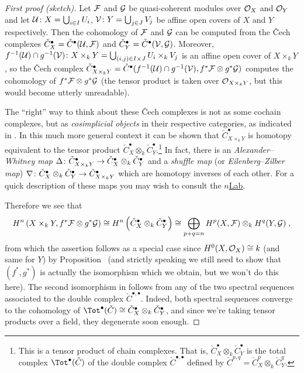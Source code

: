 \documentclass[a4paper,parskip=half,numbers=enddot, DIV=12]{scrreprt}
\begin{document}
\begin{proof}[First proof (sketch)]
	Let $\mathcal{F}$ and $\mathcal{G}$ be quasi-coherent modules over $\mathcal{O}_X$ and $\mathcal{O}_Y$ and let $\mathcal{U}\colon X=\bigcup_{i\in I}U_i$, $\mathcal{V}\colon Y=\bigcup_{j\in J}V_j$ be affine open covers of $X$ and $Y$ respectively. Then the cohomology of $\mathcal{F}$ and $\mathcal{G}$ can be computed from the \v Cech complexes $\check{C}_X^\bullet=\check{C}^\bullet(\mathcal{U},\mathcal{F})$ and $\check{C}_Y^\bullet=\check{C}^\bullet(\mathcal{V},\mathcal{G})$. Moreover, $f^{-1}(\mathcal{U})\cap g^{-1}(\mathcal{V})\colon X\times_kY=\bigcup_{(i,j)\in I\times J}U_i\times_kV_j$ is an affine open cover of $X\times_kY$, so the \v Cech complex $\check{C}_{X\times_kY}^\bullet=\check{C}^\bullet(f^{-1}(\mathcal{U})\cap g^{-1}(\mathcal{V}),f^*\mathcal{F}\otimes g^*\mathcal{G})$ computes the cohomology of $f^*\mathcal{F}\otimes g^*\mathcal{G}$ (the tensor product is taken over $\mathcal{O}_{X\times_kY}$, but this would become utterly unreadable).
	
	The ``right'' way to think about these \v Cech complexes is not as some cochain complexes, but as \emph{cosimplicial objects} in their respective categories, as indicated in \cite[Remark~1.2.1]{alggeo2}. In this much more general context it can be shown that $\check{C}_{X\times_kY}^\bullet$ is homotopy equivalent to the tensor product $\check{C}_X^\bullet\otimes_k\check{C}_Y^\bullet$.\footnote{This is a tensor product of chain complexes. That is, $\check{C}_X^\bullet\otimes_k\check{C}_Y^\bullet$ is the total complex $\Tot^\bullet(\check{C})$ of the double complex $\check{C}^{\bullet,\bullet}$ defined by $\check{C}^{p,q}=\check{C}_X^p\otimes_k\check{C}_Y^q$.} In fact, there is an \emph{Alexander--Whitney map} $\Delta\colon \check{C}_{X\times_kY}^\bullet\morphism\check{C}_X^\bullet\otimes_k\check{C}_Y^\bullet$ and a \emph{shuffle map} (or \emph{Eilenberg--Zilber map}) $\nabla\colon\check{C}_X^\bullet\otimes_k\check{C}_Y^\bullet\morphism\check{C}_{X\times_kY}^\bullet$ which are homotopy inverses of each other. For a quick description of these maps you may wish to consult the \href{https://ncatlab.org/nlab/show/Alexander-Whitney+map}{$n$Lab}.
	
	Therefore we see that
	\begin{align}\lbl{eq:Künneth}
		H^n\left(X\times_kY,f^*\Ff\otimes g^*\Gg\right)\cong H^n\left(\check{C}_X^\bullet\otimes_k\check{C}_Y^\bullet\right)\cong \bigoplus_{p+q=n}H^p(X,\Ff)\otimes_kH^q(Y,\Gg)\;,
	\end{align}
	from which the assertion follows as a special case since $H^0(X,\mathcal{O}_X)\cong k$ (and same for $Y$) by Proposition~ (and strictly speaking we still need to show that $(f^*,g^*)$ is actually the isomorphism which we obtain, but we won't do this here). The second isomorphism in  follows from any of the two spectral sequences associated to the double complex $\check{C}^{\bullet,\bullet}$. Indeed, both spectral sequences converge to the cohomology of $\Tot^\bullet(\check{C})\cong \check{C}_X^\bullet\otimes_k\check{C}_Y^\bullet$, and since we're taking tensor products over a field, they degenerate soon enough.
\end{proof}
\end{document}
